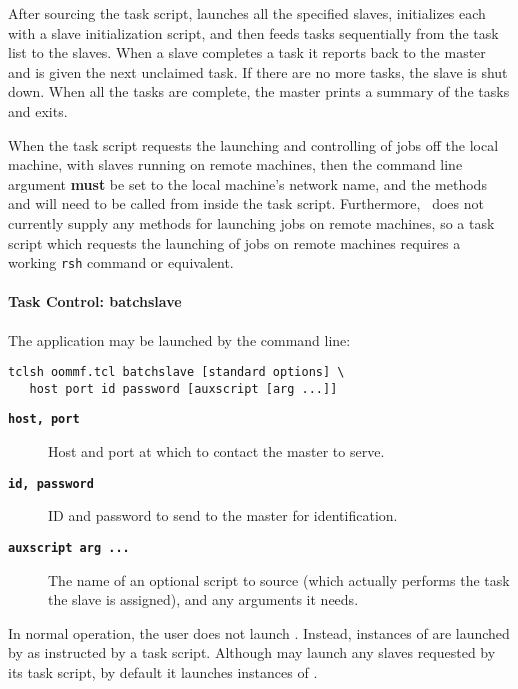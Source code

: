 After sourcing the task script,  launches all the
specified slaves, initializes each with a slave initialization script,
and then feeds tasks sequentially from the task list to the slaves.
When a slave completes a task it reports back to the master and is given
the next unclaimed task.  If there are no more tasks, the slave is shut
down.  When all the tasks are complete, the master prints a summary of
the tasks and exits.

When the task script requests the launching and controlling of jobs off
the local machine, with slaves running on remote machines, then the
command line argument  {\bf must} be set to the local machine's
network name, and the  methods  and
 will need to be called from inside the task script.
Furthermore, \OOMMF\ does not currently supply any methods for launching
jobs on remote machines, so a task script which requests the launching
of jobs on remote machines requires a working
\verb+rsh+ command or
equivalent.

\paragraph{Task Control: batchslave}\par
The application  may be launched by the command line:
\begin{verbatim}
tclsh oommf.tcl batchslave [standard options] \
   host port id password [auxscript [arg ...]]
\end{verbatim}
\begin{description}
\item[{\tt\bf host, port}]
  Host and port at which to contact the master to serve.
\item[{\tt\bf id, password}]
  ID and password to send to the master for identification.
\item[{\tt\bf auxscript arg ...}]
  The name of an optional script to source (which actually performs the
  task the slave is assigned), and any arguments it needs.
\end{description}

In normal operation, the user does not launch
.  Instead, instances of  are
launched by  as instructed by a task script.
Although \app{batchmaster} may launch any slaves requested
by its task script, by default it launches instances of
.


